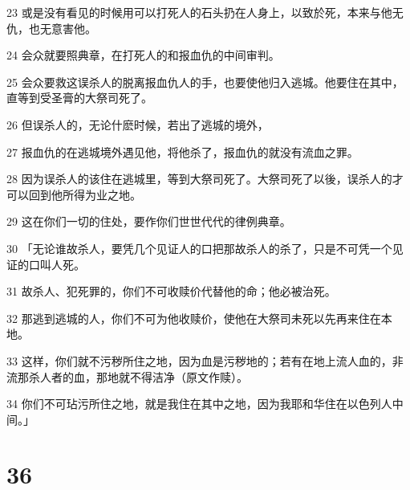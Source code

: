 \par 23 或是没有看见的时候用可以打死人的石头扔在人身上，以致於死，本来与他无仇，也无意害他。
\par 24 会众就要照典章，在打死人的和报血仇的中间审判。
\par 25 会众要救这误杀人的脱离报血仇人的手，也要使他归入逃城。他要住在其中，直等到受圣膏的大祭司死了。
\par 26 但误杀人的，无论什麽时候，若出了逃城的境外，
\par 27 报血仇的在逃城境外遇见他，将他杀了，报血仇的就没有流血之罪。
\par 28 因为误杀人的该住在逃城里，等到大祭司死了。大祭司死了以後，误杀人的才可以回到他所得为业之地。
\par 29 这在你们一切的住处，要作你们世世代代的律例典章。
\par 30 「无论谁故杀人，要凭几个见证人的口把那故杀人的杀了，只是不可凭一个见证的口叫人死。
\par 31 故杀人、犯死罪的，你们不可收赎价代替他的命；他必被治死。
\par 32 那逃到逃城的人，你们不可为他收赎价，使他在大祭司未死以先再来住在本地。
\par 33 这样，你们就不污秽所住之地，因为血是污秽地的；若有在地上流人血的，非流那杀人者的血，那地就不得洁净（原文作赎）。
\par 34 你们不可玷污所住之地，就是我住在其中之地，因为我耶和华住在以色列人中间。」

\chapter{36}

